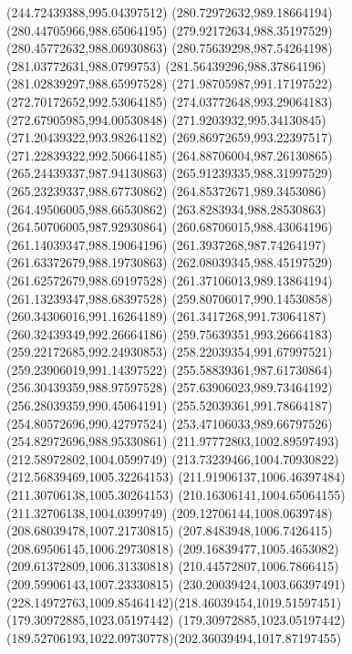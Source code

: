 {{	\lineto(244.72439388,995.04397512)
	\closepath
	\moveto(280.72972632,989.18664194)
	\lineto(280.44705966,988.65064195)
	\lineto(279.92172634,988.35197529)
	\lineto(280.45772632,988.06930863)
	\lineto(280.75639298,987.54264198)
	\lineto(281.03772631,988.0799753)
	\lineto(281.56439296,988.37864196)
	\lineto(281.02839297,988.65997528)
	\closepath
	\moveto(271.98705987,991.17197522)
	\lineto(272.70172652,992.53064185)
	\lineto(274.03772648,993.29064183)
	\lineto(272.67905985,994.00530848)
	\lineto(271.9203932,995.34130845)
	\lineto(271.20439322,993.98264182)
	\lineto(269.86972659,993.22397517)
	\lineto(271.22839322,992.50664185)
	\closepath
	\moveto(264.88706004,987.26130865)
	\lineto(265.24439337,987.94130863)
	\lineto(265.91239335,988.31997529)
	\lineto(265.23239337,988.67730862)
	\lineto(264.85372671,989.3453086)
	\lineto(264.49506005,988.66530862)
	\lineto(263.8283934,988.28530863)
	\lineto(264.50706005,987.92930864)
	\closepath
	\moveto(260.68706015,988.43064196)
	\lineto(261.14039347,988.19064196)
	\lineto(261.3937268,987.74264197)
	\lineto(261.63372679,988.19730863)
	\lineto(262.08039345,988.45197529)
	\lineto(261.62572679,988.69197528)
	\lineto(261.37106013,989.13864194)
	\lineto(261.13239347,988.68397528)
	\closepath
	\moveto(259.80706017,990.14530858)
	\lineto(260.34306016,991.16264189)
	\lineto(261.3417268,991.73064187)
	\lineto(260.32439349,992.26664186)
	\lineto(259.75639351,993.26664183)
	\lineto(259.22172685,992.24930853)
	\lineto(258.22039354,991.67997521)
	\lineto(259.23906019,991.14397522)
	\closepath
	\moveto(255.58839361,987.61730864)
	\lineto(256.30439359,988.97597528)
	\lineto(257.63906023,989.73464192)
	\lineto(256.28039359,990.45064191)
	\lineto(255.52039361,991.78664187)
	\lineto(254.80572696,990.42797524)
	\lineto(253.47106033,989.66797526)
	\lineto(254.82972696,988.95330861)
	\closepath
	\moveto(211.97772803,1002.89597493)
	\lineto(212.58972802,1004.0599749)
	\lineto(213.73239466,1004.70930822)
	\lineto(212.56839469,1005.32264153)
	\lineto(211.91906137,1006.46397484)
	\lineto(211.30706138,1005.30264153)
	\lineto(210.16306141,1004.65064155)
	\lineto(211.32706138,1004.0399749)
	\closepath
	\moveto(209.12706144,1008.0639748)
	\lineto(208.68039478,1007.21730815)
	\lineto(207.8483948,1006.7426415)
	\lineto(208.69506145,1006.29730818)
	\lineto(209.16839477,1005.4653082)
	\lineto(209.61372809,1006.31330818)
	\lineto(210.44572807,1006.7866415)
	\lineto(209.59906143,1007.23330815)
	\closepath
	\moveto(230.20039424,1003.66397491)
	\curveto(228.14972763,1009.85464142)(218.46039454,1019.51597451)(179.30972885,1023.05197442)
	\curveto(179.30972885,1023.05197442)(189.52706193,1022.09730778)(202.36039494,1017.87197455)
}}
